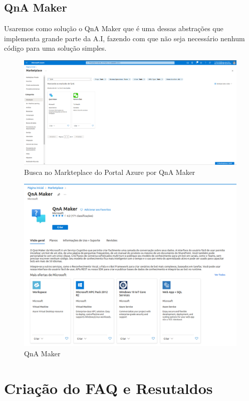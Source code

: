 \documentclass[12pt]{article}
\begin{document}
\subsection{QnA Maker}
Usaremos como solução o QnA Maker que é uma dessas abstrações que implementa grande parte da A.I, fazendo com que não seja necessário nenhum código para uma solução simples.

\begin{figure}[ht]
\centering
\includegraphics[width=1\textwidth]{images/PortalAzure_QnAMaker.png}
\caption{Busca no Markteplace do Portal Azure por QnA Maker}
\label{fig:PortalAzure_QnAMaker}
\end{figure}

\begin{figure}[ht]
\centering
\includegraphics[width=.9\textwidth]{images/QnA_Maker.png}
\caption{QnA Maker}
\label{fig:PortalAzure_QnAMaker}
\end{figure}


\section{Criação do FAQ e Resutaldos }
\end{document}
